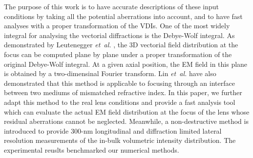 \documentclass[9pt,twocolumn,twoside]{osajnl}
\begin{document}
The purpose of this work is to have accurate descriptions of these input conditions by taking all the potential aberrations into account, and to have fast analyses with a proper transformation of the VDIs. One of the most widely integral for analysing the vectorial diffractions is the Debye-Wolf integral. As demonstrated by Leutenegger \emph{et~al.} \cite{leutenegger2006fast}, the 3D vectorial field distribution at the focus can be computed plane by plane under a proper transformation of the original Debye-Wolf integral. At a given axial position, the EM field in this plane is obtained by a two-dimensinal Fourier transform. Lin \emph{et~al.} \cite{Lin2012} have also demonstrated that this method is applicable to focusing through an interface between two mediums of mismatched refractive index. In this paper, we further adapt this method to the real lens conditions and provide a fast analysis tool which can evaluate the actual EM field distribution at the focus of the lens whose residual aberrations cannot be neglected. Meanwhile, a non-destructive method is introduced to provide 300-nm longitudinal and diffraction limited lateral resolution measurements of the in-bulk volumetric intensity distribution. The experimental reuslts benchmarked our numerical methods. 
\end{document}
